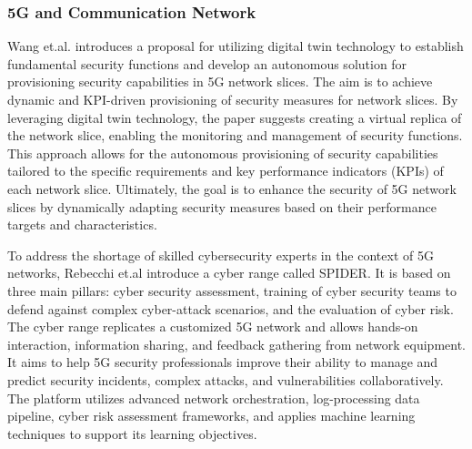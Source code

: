 


\subsubsection*{5G and Communication Network}

Wang et.al. \cite{wangDigitalTwinNetwork2022a} introduces a proposal for utilizing digital twin technology to establish fundamental security functions and develop an autonomous solution for provisioning security capabilities in 5G network slices. The aim is to achieve dynamic and KPI-driven provisioning of security measures for network slices. By leveraging digital twin technology, the paper suggests creating a virtual replica of the network slice, enabling the monitoring and management of security functions. This approach allows for the autonomous provisioning of security capabilities tailored to the specific requirements and key performance indicators (KPIs) of each network slice. Ultimately, the goal is to enhance the security of 5G network slices by dynamically adapting security measures based on their performance targets and characteristics.


To address the shortage of skilled cybersecurity experts in the context of 5G networks, Rebecchi et.al \cite{rebecchiDigitalTwin5G2022} introduce a cyber range called SPIDER. It is based on three main pillars: cyber security assessment, training of cyber security teams to defend against complex cyber-attack scenarios, and the evaluation of cyber risk. The cyber range replicates a customized 5G network and allows hands-on interaction, information sharing, and feedback gathering from network equipment. It aims to help 5G security professionals improve their ability to manage and predict security incidents, complex attacks, and vulnerabilities collaboratively. The platform utilizes advanced network orchestration, log-processing data pipeline, cyber risk assessment frameworks, and applies machine learning techniques to support its learning objectives.


